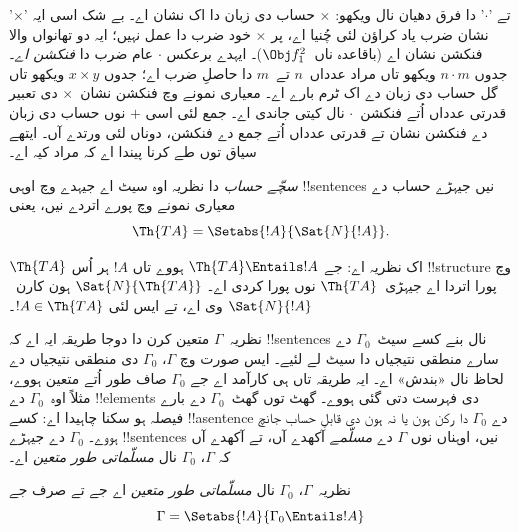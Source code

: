 \documentclass[../../../include/open-logic-section]{subfiles}
\begin{document}
'$\times$' تے '$\cdot$' دا فرق دھیان
نال ویکھو: $\times$ حساب دی زبان
دا اک نشان اے۔ بے شک اسی ایہ نشان
ضرب یاد کراؤن لئی چُنیا اے، پر
$\times$ خود ضرب دا عمل نہیں؛ ایہ
دو تھانواں والا فنکشن نشان اے
(باقاعدہ ناں~$\Obj f^2_1$)۔
ایہدے برعکس $\cdot$ عام ضرب
دا \emph{فنکشن اے}۔ جدوں
$n \cdot m$ ویکھو تاں مراد
عدداں~$n$ تے~$m$ دا حاصلِ
ضرب اے؛ جدوں $x \times y$
ویکھو تاں گل حساب دی زبان
دے اک ٹرم بارے اے۔ معیاری
نمونے وچ فنکشن نشان~$\times$
دی تعبیر قدرتی عدداں اُتے
فنکشن~$\cdot$ نال کیتی
جاندی اے۔ جمع لئی اسی $+$
نوں حساب دی زبان دے فنکشن
نشان تے قدرتی عدداں اُتے
جمع دے فنکشن، دوناں لئی
ورتدے آں۔ ایتھے سیاق
توں طے کرنا پیندا اے کہ
مراد کیہ اے۔

\begin{defn}
\emph{سچّے حساب} دا نظریہ
اوہ سیٹ اے جیہدے وچ اوہی !!{sentence}s
نیں جیہڑے حساب دے معیاری
نمونے وچ پورے اتردے نیں،
یعنی
\[
\Th{TA} = \Setabs{!A}{\Sat{N}{!A}}.
\]
\end{defn}

$\Th{TA}$ اک نظریہ اے:
جے $\Th{TA} \Entails !A$
ہووے تاں $!A$ ہر اُس
!!{structure} وچ پورا
اتردا اے جیہڑی~$\Th{TA}$
نوں پورا کردی اے۔
$\Sat{N}{\Th{TA}}$ ہون
کارن~$\Sat{N}{!A}$
وی اے، تے ایس لئی
$!A \in \Th{TA}$۔

نظریہ~$\Gamma$ متعین
کرن دا دوجا طریقہ ایہ
اے کہ !!{sentence}s نال
بنے کسے سیٹ~$\Gamma_0$
دے سارے منطقی نتیجیاں
دا سیٹ لے لئیے۔ ایس
صورت وچ $\Gamma$،
$\Gamma_0$ دی منطقی
نتیجیاں دے لحاظ نال
«بندش» اے۔ ایہ طریقہ
تاں ہی کارآمد اے جے
$\Gamma_0$ صاف طور اُتے
متعین ہووے، مثلاً
اوہ~$\Gamma_0$ دے !!{element}s دی
فہرست دتی گئی ہووے۔
گھٹ توں گھٹ~$\Gamma_0$
دے بارے فیصلہ ہو سکنا
چاہیدا اے: کسے
!!a{sentence} دے
$\Gamma_0$ دا رکن
ہون یا نہ ہون دی
قابلِ حساب جانچ ہووے۔
$\Gamma_0$ دے جیہڑے
!!{sentence}s نیں، اوہناں نوں
$\Gamma$ دے \emph{مسلّمے}
آکھدے آں، تے آکھدے
آں کہ $\Gamma$،
$\Gamma_0$ نال
\emph{مسلّماتی طور متعین}
اے۔

\begin{defn}
نظریہ~$\Gamma$،
$\Gamma_0$ نال
\emph{مسلّماتی طور متعین}
اے جے تے صرف جے
\[
\Gamma = \Setabs{!A}{\Gamma_0 \Entails !A}
\]
\end{defn}
\end{document}
